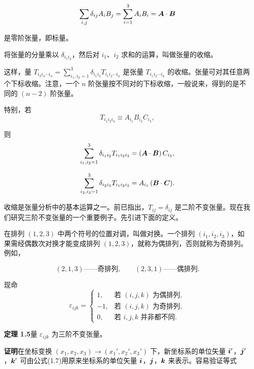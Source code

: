 \begin{equation*}
\sum_{i,j} \delta_{ij} A_i B_j = \sum_{i=1}^{3} A_i B_i = \bm{A} \cdot \bm{B}
\end{equation*}

是零阶张量，即标量。

将张量的分量乘以 $\delta_{i_1 i_2}$，然后对 $i_1$、$i_2$ 求和的运算，叫做张量的收缩。

这样，量 $T_{i_3 i_4 \cdots i_n} = \sum_{i_1, i_2 = 1}^{3} \delta_{i_1 i_2} T_{i_1 i_2 \cdots i_n}$ 是张量 $T_{i_1 i_2 \cdots i_n}$ 的收缩。张量可对其任意两个下标收缩。注意，一个 $n$ 阶张量按不同对的下标收缩，一般说来，得到的是不同的 $(n - 2)$ 阶张量。

特别，若
\begin{equation*}
T_{i_1 i_2 i_3} \equiv A_{i_1} B_{i_2} C_{i_3},
\end{equation*}

则
\begin{equation*}
\sum_{i_1, i_2 = 1}^{3} \delta_{i_1 i_2} T_{i_1 i_2 i_3} = (\bm{A} \cdot \bm{B})\, C_{i_3},
\end{equation*}

\begin{equation*}
\sum_{i_2, i_3 = 1}^{3} \delta_{i_2 i_3} T_{i_1 i_2 i_3} = A_{i_1}\, (\bm{B} \cdot \bm{C}).
\end{equation*}

收缩是张量分析中的基本运算之一。前已指出，$T_{ij} = \delta_{ij}$ 是二阶不变张量。现在我们研究三阶不变张量的一个重要例子。先引进下面的定义。

在排列 $(1, 2, 3)$ 中两个符号的位置对调，叫做对换。一个排列 $(i_1, i_2, i_3)$，如果需经偶数次对换才能变成排列 $(1, 2, 3)$，就称为偶排列，否则就称为奇排列。例如，

\[
(2, 1, 3) \text{——奇排列}, \qquad (2, 3, 1) \text{——偶排列}.
\]

现命
\begin{equation*}
\varepsilon_{ijk} =
\begin{cases}
1,  & \text{若 } (i, j, k) \text{ 为偶排列},\\
-1, & \text{若 } (i, j, k) \text{ 为奇排列},\\
0,  & \text{若 } i, j, k \text{ 并非都不同}.
\end{cases}
\end{equation*}

\textbf{定理 1.5}\quad 量 $\varepsilon_{ijk}$ 为三阶不变张量。

\textbf{证明}\quad 在坐标变换 $(x_1, x_2, x_3) \longrightarrow (x_1', x_2', x_3')$ 下，新坐标系的单位矢量 $\bm{i}'$，$\bm{j}'$，$\bm{k}'$ 可由公式(1.7)用原来坐标系的单位矢量 $\bm{i}$，$\bm{j}$，$\bm{k}$ 来表示。容易验证等式

